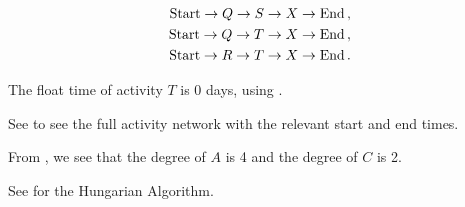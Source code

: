 \begin{subquestions}
\begin{subsubquestions}
\begin{align}
	\text{Start} \rightarrow Q \rightarrow S \rightarrow X \rightarrow \text{End}\,, \nonumber \\
	\text{Start} \rightarrow Q \rightarrow T \rightarrow X \rightarrow \text{End}\,, \nonumber \\
	\text{Start} \rightarrow R \rightarrow T \rightarrow X \rightarrow \text{End}\,.
\end{align}


\subsubquestion

The float time of activity $T$ is 0 days, using .

\end{subsubquestions}

See  to see the full activity network with the relevant start and end times.


\subquestion

From , we see that the degree of $A$ is 4 and the degree of $C$ is 2.


\subquestion

\begin{subsubquestions}

\subsubquestion 

See  for the Hungarian Algorithm.


\end{subsubquestions}
\end{subquestions}
